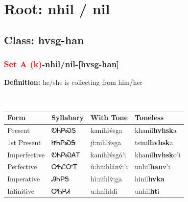 \needspace{4in}
\section*{Root: nhil / nil}
\nopagebreak
{}
\needspace{3in}
\subsection*{Class: hvsg-han}
\nopagebreak
\needspace{2in}
\subsubsection*{\textcolor{Red}{Set A (k)}{-}\textbf{nhil/nil}{-}[hvsg-han]}
\nopagebreak
\textbf{Definition: } he/she is collecting from him/her
\\[0.5em]
\begin{tabularx}{\textwidth}{l X X X}%
\toprule%
\textbf{Form}&\textbf{Syllabary}&\textbf{With Tone}&\textbf{Toneless}\\%
\midrule%
Present&ᎧᏂᏢᏍᎦ&kanihlv́sga&khanil\textbf{hvhsk}a\\%
1st Present&ᏥᏂᏢᏍᎦ&jì:nihlv́sga&tsinil\textbf{hvhsk}a\\%
Imperfective&ᎧᏂᏢᏍᎪᎢ&kanihlv́sgó’i&khanil\textbf{hvhsk}o'i\\%
Perfective&ᎤᏂᏝᏅᎢ&ù:hnihlánv́:’i&unhil\textbf{han}v'i\\%
Imperative&ᎯᏂᏢᎦ&hì:nihlv̀:ga&hinil\textbf{hvka}\\%
Infinitive&ᎤᏂᏢᏗ&u:hnihldi&unhil\textbf{ht}i\\%
\bottomrule%
\end{tabularx}
\\[1em]